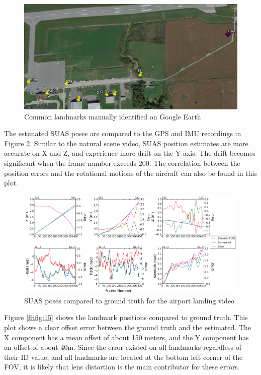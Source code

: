 \begin{figure}[h]
\centering
\includegraphics[width=13cm, keepaspectratio=true]
{./Figures/fltfig/airport/uav_and_identified_landmark.png}
\caption{Common landmarks manually identified on Google Earth }
\label{fltfig:12}
\end{figure}
\FloatBarrier 

The estimated SUAS poses are compared to the GPS
and IMU recordings in Figure \ref{fltfig:13}. Similar to the natural
scene video, SUAS position estimates are more accurate on X and Z,
and experience more drift on the Y axis. The drift becomes significant
when the frame number exceeds 200. The correlation between the position errors
and the rotational motions of the aircraft can also be found in this
plot.

\begin{figure}[h]
\centering
\includegraphics[width=17cm, keepaspectratio=true]
{./Figures/fltfig/airport/Figure10.png}
\caption{SUAS poses compared to ground truth for the airport landing video}
\label{fltfig:13}
\end{figure}
\FloatBarrier

Figure \ref{fltfig:15} shows the landmark positions compared to
ground truth. This plot shows a clear offset error between the ground
truth and the estimated. The X component has a mean offset of about
150 meters, and the Y component has an offset of about 40m. Since the
error existed on all landmarks regardless of their ID value, and all
landmarks are located at the bottom left corner of the FOV, it is
likely that lens distortion is the main contributor for these errors.


